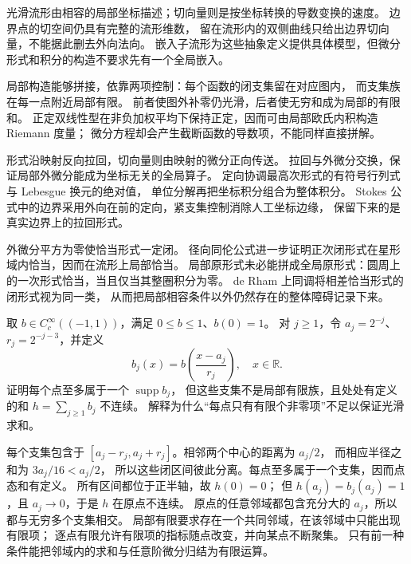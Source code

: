 \begin{chaptersummary}
光滑流形由相容的局部坐标描述；切向量则是按坐标转换的导数变换的速度。
边界点的切空间仍具有完整的流形维数，
留在流形内的双侧曲线只给出边界切向量，不能据此删去外向法向。
嵌入子流形为这些抽象定义提供具体模型，但微分形式和积分的构造不要求先有一个全局嵌入。

\ProseParagraphBreak

局部构造能够拼接，依靠两项控制：每个函数的闭支集留在对应图内，
而支集族在每一点附近局部有限。
前者使图外补零仍光滑，后者使无穷和成为局部的有限和。
正定双线性型在非负加权平均下保持正定，因而可由局部欧氏内积构造 Riemann 度量；
微分方程却会产生截断函数的导数项，不能同样直接拼解。

\ProseParagraphBreak

形式沿映射反向拉回，切向量则由映射的微分正向传送。
拉回与外微分交换，保证局部外微分能成为坐标无关的全局算子。
定向协调最高次形式的有符号行列式与 Lebesgue 换元的绝对值，
单位分解再把坐标积分组合为整体积分。
Stokes 公式中的边界采用外向在前的定向，紧支集控制消除人工坐标边缘，
保留下来的是真实边界上的拉回形式。

\ProseParagraphBreak

外微分平方为零使恰当形式一定闭。
径向同伦公式进一步证明正次闭形式在星形域内恰当，因而在流形上局部恰当。
局部原形式未必能拼成全局原形式：圆周上的一次形式恰当，当且仅当其整圈积分为零。
de Rham 上同调将相差恰当形式的闭形式视为同一类，
从而把局部相容条件以外仍然存在的整体障碍记录下来。
\end{chaptersummary}

\BookExercises

\begin{exercise}\label{b1:ex:E-point-finite-bumps}
取 \(b\in C_c^\infty((-1,1))\)，满足 \(0\leq b\leq1\)、\(b(0)=1\)。
对 \(j\geq1\)，令 \(a_j=2^{-j}\)、\(r_j=2^{-j-3}\)，并定义
\[
 b_j(x)=b\!\left(\frac{x-a_j}{r_j}\right),\quad x\in\mathbb R.
\]
证明每个点至多属于一个 \(\operatorname{supp}b_j\)，
但这些支集不是局部有限族，且处处有定义的和 \(h=\sum_{j\geq1}b_j\) 不连续。
解释为什么“每点只有有限个非零项”不足以保证光滑求和。
\end{exercise}
\begin{solution}
每个支集包含于 \([a_j-r_j,a_j+r_j]\)。相邻两个中心的距离为 \(a_j/2\)，
而相应半径之和为 \(3a_j/16<a_j/2\)，
所以这些闭区间彼此分离。每点至多属于一个支集，因而点态和有定义。
所有区间都位于正半轴，故 \(h(0)=0\)；
但 \(h(a_j)=b_j(a_j)=1\)，且 \(a_j\to0\)，于是 \(h\) 在原点不连续。
原点的任意邻域都包含充分大的 \(a_j\)，所以都与无穷多个支集相交。
局部有限要求存在一个共同邻域，在该邻域中只能出现有限项；
逐点有限允许有限项的指标随点改变，并向某点不断聚集。
只有前一种条件能把邻域内的求和与任意阶微分归结为有限运算。
\end{solution}

